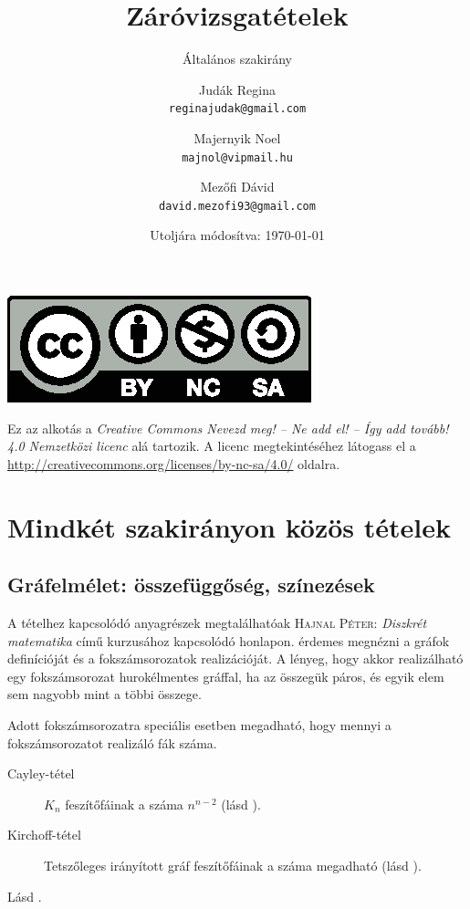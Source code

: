 \documentclass[DIV=15,appendixprefix]{scrreprt}
\title{Záróvizsgatételek}
\subtitle{Általános szakirány}
\author{Judák Regina\\\texttt{reginajudak@gmail.com}%
	\and%
	Majernyik Noel\\\texttt{majnol@vipmail.hu}
	\and%
	Mezőfi Dávid\\\texttt{david.mezofi93@gmail.com}}
\date{Utoljára módosítva: \today}
\theoremstyle{definition}
\theoremstyle{remark}
\begin{document}
%
\maketitle
%
\begin{center}
	\includegraphics{by-nc-sa.eps}
\end{center}
Ez az alkotás a \emph{Creative Commons Nevezd meg! -- Ne add el! -- Így add tovább! 4.0 Nemzetközi
licenc} alá tartozik. A licenc megtekintéséhez látogass el a
\url{http://creativecommons.org/licenses/by-nc-sa/4.0/} oldalra.
%
\tableofcontents
%
%
%
\chapter{Mindkét szakirányon közös tételek}
%
\section{Gráfelmélet: összefüggőség, színezések}
A tételhez kapcsolódó anyagrészek megtalálhatóak \textsc{Hajnal Péter}: \emph{Diszkrét matematika}
\cite{DiMat} című kurzusához kapcsolódó honlapon.
%
 érdemes megnézni a gráfok definícióját és a
fokszámsorozatok realizációját. A lényeg, hogy akkor realizálható egy fokszámsorozat hurokélmentes
gráffal, ha az összegük páros, és egyik elem sem nagyobb mint a többi összege.

Adott fokszámsorozatra speciális esetben megadható, hogy mennyi a fokszámsorozatot realizáló fák
száma.
\begin{description}
	\item[Cayley-tétel] $ K_n $ feszítőfáinak a száma $n^{n-2}$ (lásd
		\cite[\href{http://www.math.u-szeged.hu/~hajnal/courses/MSc_Diszkret/MSc_kombi13/ea-fak.pdf}
		{\emph{Fák összeszámlálása I. -- Cayley tétele}}]{DiMat}).
	\item[Kirchoff-tétel] Tetszőleges irányított gráf feszítőfáinak a száma megadható (lásd
	\cite[\href{http://www.math.u-szeged.hu/~hajnal/courses/MSc_Diszkret/MSc_kombi13/ea-fak.pdf}{%
		\emph{Fák összeszámlálása II. -- Kirchoff tétele}}, 6.~oldal]{DiMat}).
\end{description}
%
Lásd
\cite[\href{http://www.math.u-szeged.hu/~hajnal/courses/MSc_Diszkret/MSc_kombi13/ea-Vizing.pdf}{%
\emph{Gráfok élszínezései}}]{DiMat}.
\end{document}
